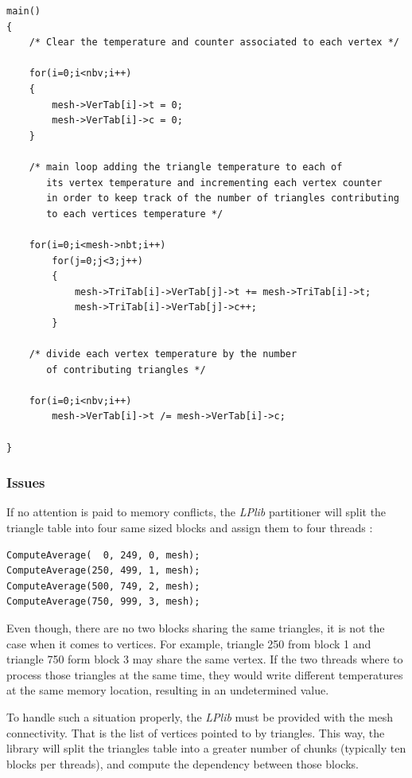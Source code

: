 \documentclass[a4paper,12pt]{article}
\begin{document}
\begin{tt}
\begin{verbatim}
main()
{
    /* Clear the temperature and counter associated to each vertex */

    for(i=0;i<nbv;i++)
    {
        mesh->VerTab[i]->t = 0;
        mesh->VerTab[i]->c = 0;
    }

    /* main loop adding the triangle temperature to each of
       its vertex temperature and incrementing each vertex counter
       in order to keep track of the number of triangles contributing
       to each vertices temperature */

    for(i=0;i<mesh->nbt;i++)
        for(j=0;j<3;j++)
        {
            mesh->TriTab[i]->VerTab[j]->t += mesh->TriTab[i]->t;
            mesh->TriTab[i]->VerTab[j]->c++;
        }

    /* divide each vertex temperature by the number
       of contributing triangles */

    for(i=0;i<nbv;i++)
        mesh->VerTab[i]->t /= mesh->VerTab[i]->c;

}
\end{verbatim}
\end{tt}
\normalfont

\subsubsection{Issues}

If no attention is paid to memory conflicts, the \emph{LPlib} partitioner will split the triangle table into four same sized blocks and assign them to four threads :

\begin{tt}
\begin{verbatim}
ComputeAverage(  0, 249, 0, mesh);
ComputeAverage(250, 499, 1, mesh);
ComputeAverage(500, 749, 2, mesh);
ComputeAverage(750, 999, 3, mesh);
\end{verbatim}
\end{tt}
\normalfont

Even though, there are no two blocks sharing the same triangles, it is not the case when it comes to vertices. For example, triangle 250 from block 1 and triangle 750 form block 3 may share the same vertex. If the two threads where to process those triangles at the same time, they would write different temperatures at the same memory location, resulting in an undetermined value.

To handle such a situation properly, the \emph{LPlib} must be provided with the mesh connectivity. That is the list of vertices pointed to by triangles. This way, the library will split the triangles table into a greater number of chunks (typically ten blocks per threads), and compute the dependency between those blocks.
\end{document}
